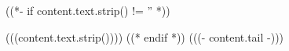 ((*- if content.text.strip() != '' *))
\par 
(((content.text.strip())))
((* endif *))
 (((- content.tail -)))


